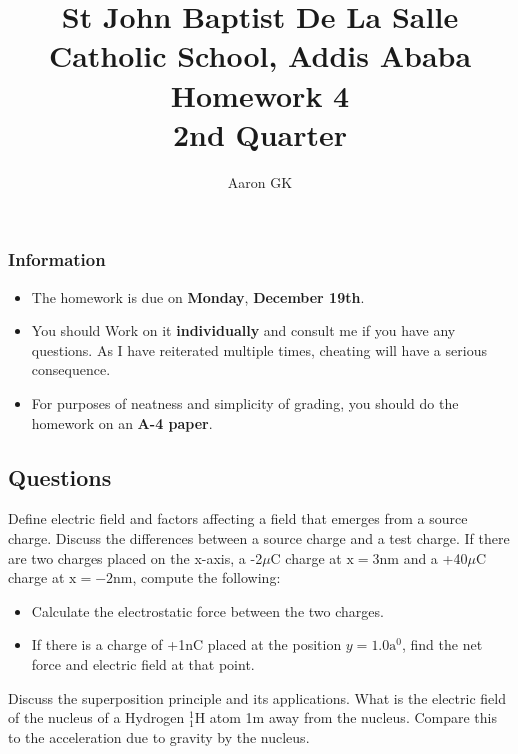 \documentclass[9pt,addpoints]{exam}
\author{Aaron GK}
\begin{document}
	\title{St John Baptist De La Salle Catholic School, Addis Ababa\\
		\large Homework 4 \\
		2nd Quarter}
	\maketitle
	\begin{center}
		\subsubsection*{Information}
		\begin{itemize}
			\item The homework is due on \textbf{Monday}, \textbf{December 19th}.
			\item You should Work on it \textbf{individually} and consult me if you have any questions. As I have reiterated multiple times, cheating will have a serious consequence.
			\item For purposes of neatness and simplicity of grading, you should do the homework on an \textbf{A-4 paper}.
		\end{itemize}
	\end{center}
	\begin{center}
		\subsection*{Questions}
	\end{center}
	
	\begin{questions}
		\question Define electric field and factors affecting a field that emerges from a source charge.
		\question Discuss the differences between a source charge and a test charge.
		\question If there are two charges placed on the x-axis, a -2$\mu\text{C}$ charge at $\text{x}=3\text{nm}$ and a +40$\mu\text{C}$ charge at $\text{x}=-2\text{nm}$, compute the following:
		\begin{itemize}
			\item Calculate the electrostatic force between the two charges.
			\item If there is a charge of +1nC placed at the position $y=1.0\text{a}^0$, find the net force and electric field at that point.
		\end{itemize}
		\question Discuss the superposition principle and its applications.
		\question What is the electric field of the nucleus of a Hydrogen $^1_1\text{H}$ atom 1m away from the nucleus. Compare this to the acceleration due to gravity by the nucleus.
	\end{questions}
\end{document}
